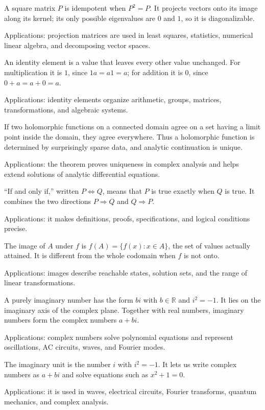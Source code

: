 A square matrix $P$ is idempotent when $P^2=P$. It projects vectors onto its image along its kernel; its only possible eigenvalues are $0$ and $1$, so it is diagonalizable. \par\noindent Applications: projection matrices are used in least squares, statistics, numerical linear algebra, and decomposing vector spaces.

An identity element is a value that leaves every other value unchanged. For multiplication it is $1$, since $1a=a1=a$; for addition it is $0$, since $0+a=a+0=a$. \par\noindent Applications: identity elements organize arithmetic, groups, matrices, transformations, and algebraic systems.

If two holomorphic functions on a connected domain agree on a set having a limit point inside the domain, they agree everywhere. Thus a holomorphic function is determined by surprisingly sparse data, and analytic continuation is unique. \par\noindent Applications: the theorem proves uniqueness in complex analysis and helps extend solutions of analytic differential equations.

“If and only if,” written $P\iff Q$, means that $P$ is true exactly when $Q$ is true. It combines the two directions $P\Rightarrow Q$ and $Q\Rightarrow P$. \par\noindent Applications: it makes definitions, proofs, specifications, and logical conditions precise.

The image of $A$ under $f$ is $f(A)=\{f(x):x\in A\}$, the set of values actually attained. It is different from the whole codomain when $f$ is not onto. \par\noindent Applications: images describe reachable states, solution sets, and the range of linear transformations.

A purely imaginary number has the form $bi$ with $b\in\mathbb R$ and $i^2=-1$. It lies on the imaginary axis of the complex plane. Together with real numbers, imaginary numbers form the complex numbers $a+bi$. \par\noindent Applications: complex numbers solve polynomial equations and represent oscillations, AC circuits, waves, and Fourier modes.

The imaginary unit is the number $i$ with $i^2=-1$. It lets us write complex numbers as $a+bi$ and solve equations such as $x^2+1=0$. \par\noindent Applications: it is used in waves, electrical circuits, Fourier transforms, quantum mechanics, and complex analysis.

